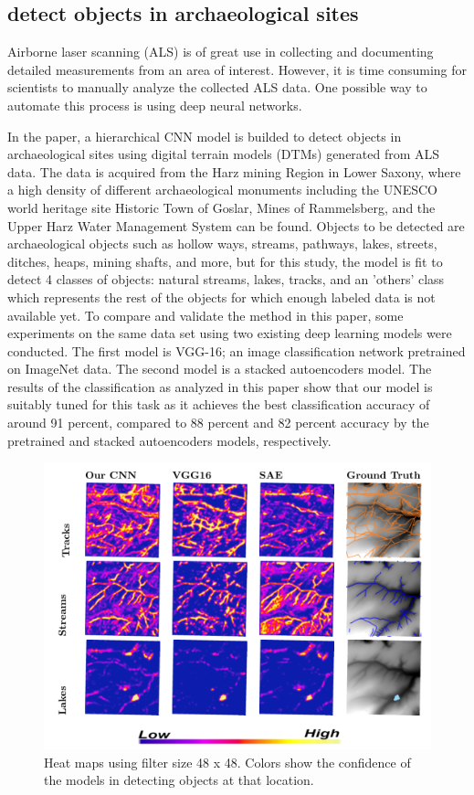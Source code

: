 \documentclass[journal]{IEEEtran}
\begin{document}
	\subsection{detect objects in archaeological sites}

	Airborne laser scanning (ALS) is of great use in
	collecting and documenting detailed measurements from an area of interest. However, it is
	time consuming for scientists to manually analyze the collected ALS data. One possible way to
	automate this process is using deep neural networks.

	In the paper\cite{AOD}, a hierarchical CNN model is builded to detect objects in archaeological sites
	using digital terrain models (DTMs) generated from ALS data. 
	The	data is acquired from the Harz mining Region in Lower Saxony, where a high density of different
	archaeological monuments including the UNESCO world heritage site Historic Town of Goslar,
	Mines of Rammelsberg, and the Upper Harz Water Management System can be found. Objects to be detected are archaeological
	objects such as hollow ways, streams, pathways, lakes, streets, ditches, heaps, mining shafts,
	and more, but for this study, the model is fit to detect 4 classes of objects: natural streams, lakes, tracks, and an 'others' class
	which represents the rest of the objects for which enough labeled data is not available yet. To
	compare and validate the method in this paper, some experiments on the same data set using two existing
	deep learning models were conducted. The first model is VGG-16; an image classification network pretrained
	on ImageNet data. The second model is a stacked autoencoders model. The results of the
	classification as analyzed in this paper show that our model is suitably tuned for this task as it
	achieves the best classification accuracy of around 91 percent, compared to 88 percent and 82
	percent accuracy by the pretrained and stacked autoencoders models, respectively.
	\begin{figure}[htbp]
		\centering
		\includegraphics[width=1.0\linewidth]{./picture/fig7.png}
		\caption{Heat maps using filter size 48 x 48. Colors show the confidence of the models in detecting
		objects at that location.}
	  \end{figure}
\end{document}
